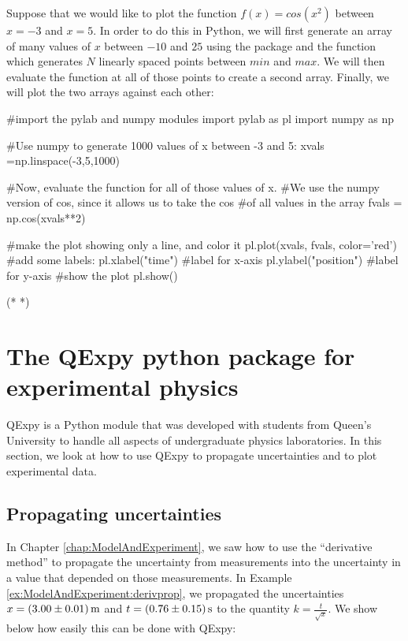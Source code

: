 Suppose that we would like to plot the function $f(x) = cos(x^2)$ between $x=-3$ and $x=5$. In order to do this in Python, we will first generate an array of many values of $x$ between $-10$ and $25$ using the  package and the function  which generates $N$ linearly spaced points between $min$ and $max$. We will then evaluate the function at all of those points to create a second array. Finally, we will plot the two arrays against each other:
\begin{python}[caption=Plotting a function of 1 variable]
#import the pylab and numpy modules
import pylab as pl
import numpy as np

#Use numpy to generate 1000 values of x between -3 and 5:
xvals =np.linspace(-3,5,1000)

#Now, evaluate the function for all of those values of x.
#We use the numpy version of cos, since it allows us to take the cos 
#of all values in the array
fvals = np.cos(xvals**2)

#make the plot showing only a line, and color it
pl.plot(xvals, fvals, color='red')
#add some labels:
pl.xlabel("time") #label for x-axis
pl.ylabel("position") #label for y-axis
#show the plot
pl.show()

\end{python}
\begin{poutput}
(*   *)
\end{poutput}

\section{The QExpy python package for experimental physics}
QExpy is a Python module that was developed with students from Queen's University to handle all aspects of undergraduate physics laboratories. In this section, we look at how to use QExpy to propagate uncertainties and to plot experimental data.

\subsection{Propagating uncertainties}
In Chapter \ref{chap:ModelAndExperiment}, we saw how to use the ``derivative method'' to propagate the uncertainty from measurements into the uncertainty in a value that depended on those measurements. In Example \ref{ex:ModelAndExperiment:derivprop}, we propagated the uncertainties $x=\SI{3.00 \pm 0.01}{m}$ and $t=\SI{0.76\pm0.15}{s}$ to the quantity $k=\frac{t}{\sqrt x}$. We show below how easily this can be done with QExpy:


